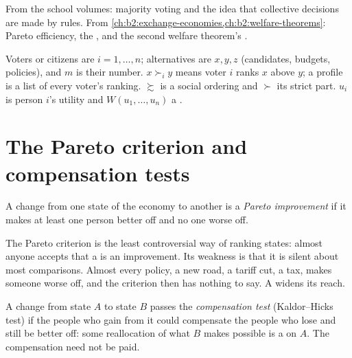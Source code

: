 \begin{recall}
From the school volumes: majority voting and the idea that collective decisions are made by rules. From
\cref{ch:b2:exchange-economies,ch:b2:welfare-theorems}: Pareto efficiency, the , and the
second welfare theorem's .
\end{recall}

\begin{notation}\label{not:b2:social-choice:symbols}
Voters or citizens are $i = 1, \dots, n$; alternatives are $x, y, z$ (candidates, budgets, policies), and
$m$ is their number. $x \succ_i y$ means voter $i$ ranks $x$ above $y$; a profile is a list of every voter's
ranking. $\succsim$ is a social ordering and $\succ$ its strict part. $u_i$ is person $i$'s utility and
$W(u_1, \dots, u_n)$ a .
\end{notation}

\section{The Pareto criterion and compensation tests}\label{sec:b2:social-choice:pareto}

\begin{definition}\label{def:b2:social-choice:pareto-improvement}
A change from one state of the economy to another is a \emph{Pareto improvement} if it makes at least one person better off and no one worse off.
\end{definition}

The Pareto criterion is the least controversial way of ranking states: almost anyone accepts that a
 is an improvement. Its weakness is that it is silent about most comparisons. Almost
every policy, a new road, a tariff cut, a tax, makes someone worse off, and the criterion then has nothing
to say. A  widens its reach.

\begin{definition}\label{def:b2:social-choice:compensation-test}
A change from state $A$ to state $B$ passes the \emph{compensation test}
(Kaldor--Hicks test) if the people who gain from it could compensate the people who lose and still be
better off: some reallocation of what $B$ makes possible is a  on $A$. The compensation
need not be paid.
\end{definition}

